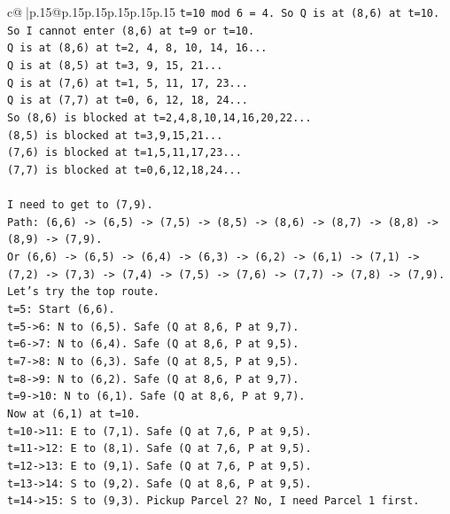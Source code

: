 \documentclass{article}
\begin{document}
{\begin{supertabular}{c@{$\;$}|p{.15\linewidth}@{}p{.15\linewidth}p{.15\linewidth}p{.15\linewidth}p{.15\linewidth}p{.15\linewidth}}
{{{\texttt{t=10 mod 6 = 4. So Q is at (8,6) at t=10.} \\
\texttt{So I cannot enter (8,6) at t=9 or t=10.} \\
\texttt{Q is at (8,6) at t=2, 4, 8, 10, 14, 16...} \\
\texttt{Q is at (8,5) at t=3, 9, 15, 21...} \\
\texttt{Q is at (7,6) at t=1, 5, 11, 17, 23...} \\
\texttt{Q is at (7,7) at t=0, 6, 12, 18, 24...} \\
\texttt{So (8,6) is blocked at t=2,4,8,10,14,16,20,22...} \\
\texttt{(8,5) is blocked at t=3,9,15,21...} \\
\texttt{(7,6) is blocked at t=1,5,11,17,23...} \\
\texttt{(7,7) is blocked at t=0,6,12,18,24...} \\
\\ 
\texttt{I need to get to (7,9).} \\
\texttt{Path: (6,6) {-}> (6,5) {-}> (7,5) {-}> (8,5) {-}> (8,6) {-}> (8,7) {-}> (8,8) {-}> (8,9) {-}> (7,9).} \\
\texttt{Or (6,6) {-}> (6,5) {-}> (6,4) {-}> (6,3) {-}> (6,2) {-}> (6,1) {-}> (7,1) {-}> (7,2) {-}> (7,3) {-}> (7,4) {-}> (7,5) {-}> (7,6) {-}> (7,7) {-}> (7,8) {-}> (7,9).} \\
\texttt{Let's try the top route.} \\
\texttt{t=5: Start (6,6).} \\
\texttt{t=5{-}>6: N to (6,5). Safe (Q at 8,6, P at 9,7).} \\
\texttt{t=6{-}>7: N to (6,4). Safe (Q at 8,6, P at 9,5).} \\
\texttt{t=7{-}>8: N to (6,3). Safe (Q at 8,5, P at 9,5).} \\
\texttt{t=8{-}>9: N to (6,2). Safe (Q at 8,6, P at 9,7).} \\
\texttt{t=9{-}>10: N to (6,1). Safe (Q at 8,6, P at 9,7).} \\
\texttt{Now at (6,1) at t=10.} \\
\texttt{t=10{-}>11: E to (7,1). Safe (Q at 7,6, P at 9,5).} \\
\texttt{t=11{-}>12: E to (8,1). Safe (Q at 7,6, P at 9,5).} \\
\texttt{t=12{-}>13: E to (9,1). Safe (Q at 7,6, P at 9,5).} \\
\texttt{t=13{-}>14: S to (9,2). Safe (Q at 8,6, P at 9,5).} \\
\texttt{t=14{-}>15: S to (9,3). Pickup Parcel 2? No, I need Parcel 1 first.} \\
}}}
\end{supertabular}}
\end{document}

